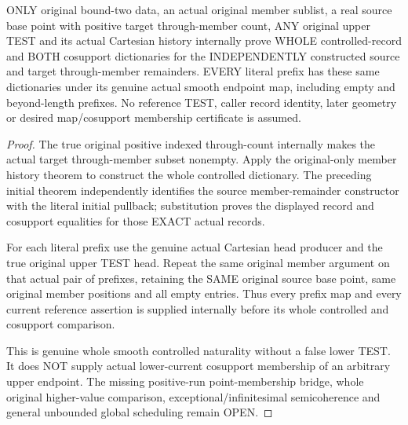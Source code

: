 \begin{theorem}
\label{hir:original-through-member-untested-controlled-all-heads}
\leanok
ONLY original bound-two data, an actual original member sublist, a real
source base point with positive target through-member count, ANY
original upper TEST and its actual Cartesian history internally prove
WHOLE controlled-record and BOTH cosupport dictionaries for the
INDEPENDENTLY constructed source and target through-member remainders.
EVERY literal prefix has these same dictionaries under its genuine
actual smooth endpoint map, including empty and beyond-length prefixes.
No reference TEST, caller record identity, later geometry or desired
map/cosupport membership certificate is assumed.
\end{theorem}
\begin{proof}
The true original positive indexed through-count internally makes the
actual target through-member subset nonempty. Apply the original-only
member history theorem to construct the whole controlled dictionary.
The preceding initial theorem independently identifies the source
member-remainder constructor with the literal initial pullback;
substitution proves the displayed record and cosupport equalities for
those EXACT actual records.

For each literal prefix use the genuine actual Cartesian head producer
and the true original upper TEST head. Repeat the same original member
argument on that actual pair of prefixes, retaining the SAME original
source base point, same original member positions and all empty entries.
Thus every prefix map and every current reference assertion is supplied
internally before its whole controlled and cosupport comparison.

This is genuine whole smooth controlled naturality without a false
lower TEST. It does NOT supply actual lower-current cosupport membership
of an arbitrary upper endpoint. The missing positive-run point-membership
bridge, whole original higher-value comparison, exceptional/infinitesimal
semicoherence and general unbounded global scheduling remain OPEN.
\end{proof}
